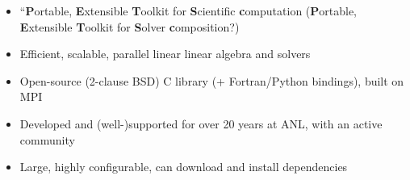 \documentclass{beamer}
\begin{document}
\begin{frame}[fragile]
\begin{center}
\end{center}
\begin{itemize}
  \item ``\textbf{P}ortable, \textbf{E}xtensible \textbf{T}oolkit for \textbf{S}cientific \textbf{c}omputation (\textbf{P}ortable, \textbf{E}xtensible \textbf{T}oolkit for \textbf{S}olver \textbf{c}omposition?)
\item Efficient, scalable, parallel linear linear algebra and solvers
\item Open-source (2-clause BSD) C library (+ Fortran/Python bindings), built on \textsc{MPI}
\item Developed and (well-)supported for over 20 years at ANL, with an active community
\item Large, highly configurable, can download and install dependencies
\end{itemize}
\end{frame}
\end{document}
